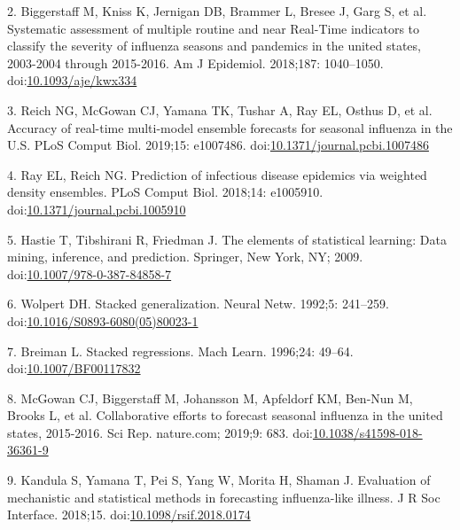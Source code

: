 \documentclass[10pt,letterpaper]{article}
\begin{document}
\leavevmode\hypertarget{ref-Biggerstaff2018-ns}{}%
2. Biggerstaff M, Kniss K, Jernigan DB, Brammer L, Bresee J, Garg S, et
al. Systematic assessment of multiple routine and near Real-Time
indicators to classify the severity of influenza seasons and pandemics
in the united states, 2003-2004 through 2015-2016. Am J Epidemiol.
2018;187: 1040--1050.
doi:\href{https://doi.org/10.1093/aje/kwx334}{10.1093/aje/kwx334}

\leavevmode\hypertarget{ref-Reich2019-ca}{}%
3. Reich NG, McGowan CJ, Yamana TK, Tushar A, Ray EL, Osthus D, et al.
Accuracy of real-time multi-model ensemble forecasts for seasonal
influenza in the U.S. PLoS Comput Biol. 2019;15: e1007486.
doi:\href{https://doi.org/10.1371/journal.pcbi.1007486}{10.1371/journal.pcbi.1007486}

\leavevmode\hypertarget{ref-Ray2018-ef}{}%
4. Ray EL, Reich NG. Prediction of infectious disease epidemics via
weighted density ensembles. PLoS Comput Biol. 2018;14: e1005910.
doi:\href{https://doi.org/10.1371/journal.pcbi.1005910}{10.1371/journal.pcbi.1005910}

\leavevmode\hypertarget{ref-Hastie2009-ft}{}%
5. Hastie T, Tibshirani R, Friedman J. The elements of statistical
learning: Data mining, inference, and prediction. Springer, New York,
NY; 2009.
doi:\href{https://doi.org/10.1007/978-0-387-84858-7}{10.1007/978-0-387-84858-7}

\leavevmode\hypertarget{ref-Wolpert1992-pw}{}%
6. Wolpert DH. Stacked generalization. Neural Netw. 1992;5: 241--259.
doi:\href{https://doi.org/10.1016/S0893-6080(05)80023-1}{10.1016/S0893-6080(05)80023-1}

\leavevmode\hypertarget{ref-Breiman1996-ez}{}%
7. Breiman L. Stacked regressions. Mach Learn. 1996;24: 49--64.
doi:\href{https://doi.org/10.1007/BF00117832}{10.1007/BF00117832}

\leavevmode\hypertarget{ref-McGowan2019-ph}{}%
8. McGowan CJ, Biggerstaff M, Johansson M, Apfeldorf KM, Ben-Nun M,
Brooks L, et al. Collaborative efforts to forecast seasonal influenza in
the united states, 2015-2016. Sci Rep. nature.com; 2019;9: 683.
doi:\href{https://doi.org/10.1038/s41598-018-36361-9}{10.1038/s41598-018-36361-9}

\leavevmode\hypertarget{ref-Kandula2018-sq}{}%
9. Kandula S, Yamana T, Pei S, Yang W, Morita H, Shaman J. Evaluation of
mechanistic and statistical methods in forecasting influenza-like
illness. J R Soc Interface. 2018;15.
doi:\href{https://doi.org/10.1098/rsif.2018.0174}{10.1098/rsif.2018.0174}
\end{document}
